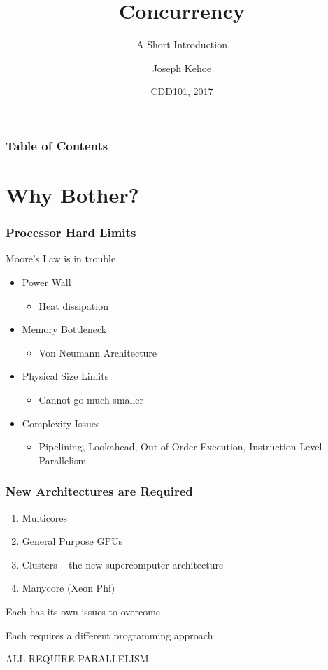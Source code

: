 \documentclass{beamer}
\title[Concurrency] %
{Concurrency}
\subtitle{A Short Introduction}
\author[Dr. Joseph Kehoe] %
{Joseph Kehoe\inst{1}}
\institute[IT Carlow] %
{
	\inst{1}%
	Department of Computing and Networking\\
	Institute of Technology Carlow
}
\date[ITC 2017] %
{CDD101, 2017}
\begin{document}
 
\frame{\titlepage}
 
 
 
 \begin{frame}
 	\frametitle{Table of Contents}
 	\tableofcontents
 \end{frame}
 
 
 \section{Why Bother?}
\begin{frame}
\frametitle{Processor Hard Limits}
Moore’s Law is in trouble
\begin{itemize}
\item Power Wall
\begin{itemize}
\item Heat dissipation
\end{itemize}
\item Memory Bottleneck
\begin{itemize}
\item Von Neumann Architecture
\end{itemize}
\item Physical Size Limits
\begin{itemize}
\item Cannot go much smaller
\end{itemize}
\item Complexity Issues
\begin{itemize}
\item Pipelining, Lookahead, Out of Order Execution, Instruction Level Parallelism
\end{itemize}
\end{itemize}
\end{frame}

\begin{frame}
	\frametitle{New Architectures are Required}
\begin{enumerate}
	\item Multicores
	\item General Purpose GPUs
	\item Clusters – the new supercomputer architecture
	\item Manycore (Xeon Phi)
	\end{enumerate}	
Each has its own issues to overcome

Each requires a different programming approach

ALL REQUIRE PARALLELISM
	
\end{frame}
\end{document}
